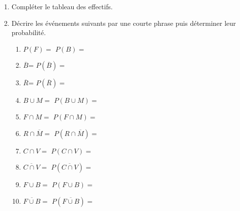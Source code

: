 \documentclass[main.tex]{subfiles}
\begin{document}
\begin{exercise}
	\begin{enumerate}[label=\arabic*), leftmargin=*] 
		\item Compléter le tableau des effectifs.
		\item Décrire les événements suivants par une courte phrase puis déterminer leur probabilité. \vspace{-0.5em}
		\begin{enumerate}[label={\rule{0pt}{1.8em}\alph*)},leftmargin=*]
			\item $P(F)= $ \dotfill $P(B)=$\dotfill\null 
			\item $\overline{B}$= \dotfill $P(\overline{B})=\qquad\qquad$
			\item $\overline{R}$= \dotfill $P(\overline{R})=\qquad\qquad$
			\item $B\cup M=$ \dotfill $P(B\cup M)=\qquad\qquad$
			\item $F\cap M=$ \dotfill $P(F\cap M)=\qquad\qquad$
			\item $R\cap \overline{M}=$ \dotfill $P(R\cap \overline{M})=\qquad\qquad$
			\item $C\cap V=$ \dotfill $P(C\cap V)=\qquad\qquad$
			\item $\overline{C\cap V}=$ \dotfill $P(\overline{C\cap V})=\qquad\qquad$
			\item $F\cup B=$ \dotfill $P(F\cup B)=\qquad\qquad$ 
			\item $\overline{F\cup B}=$ \dotfill $P(\overline{F\cup B})=\qquad\qquad$ 
		\end{enumerate} 
		\end{enumerate}  
\end{exercise}
\newpage 
\end{document}
